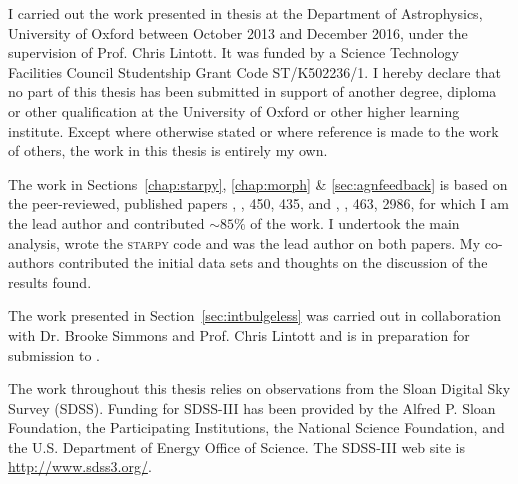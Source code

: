 \documentclass[12pt,useAMS]{ociamthesis}  %
\def\minor		{\color{minorcol}}
\begin{document}
\begin{originalitylong}
I carried out the work presented in thesis at the Department of Astrophysics, University of Oxford between October 2013 and December 2016, under the supervision of Prof. Chris Lintott. It was funded by a Science Technology Facilities Council Studentship Grant Code ST/K502236/1. I hereby declare that no part of this thesis has been submitted in support of another degree, diploma or other qualification at the University of Oxford or other higher learning institute. Except where otherwise stated or where reference is made to the work of others, the work in this thesis is entirely my own.

The work in Sections~\ref{chap:starpy}, \ref{chap:morph} \& \ref{sec:agnfeedback} is based on the peer-reviewed, published papers \citealt{smethurst15}, \mnras, 450, 435, and \citealt{smethurst16}, \mnras, 463, 2986, for which I am the lead author {\minor and contributed $\sim85\%$ of the work. I undertook the main analysis, wrote the \textsc{starpy} code and was the lead author on both papers. My co-authors contributed the initial data sets and thoughts on the discussion of the results found}. 

The work presented in Section~\ref{sec:intbulgeless} was carried out in collaboration with Dr. Brooke Simmons and Prof. Chris Lintott and is in preparation for submission to \mnras.

The work throughout this thesis relies on observations from the Sloan Digital Sky Survey (SDSS). Funding for SDSS-III has been provided by the Alfred P. Sloan Foundation, the Participating Institutions, the National Science Foundation, and the U.S. Department of Energy Office of Science. The SDSS-III web site is \url{http://www.sdss3.org/}.



\end{originalitylong}
\end{document}
